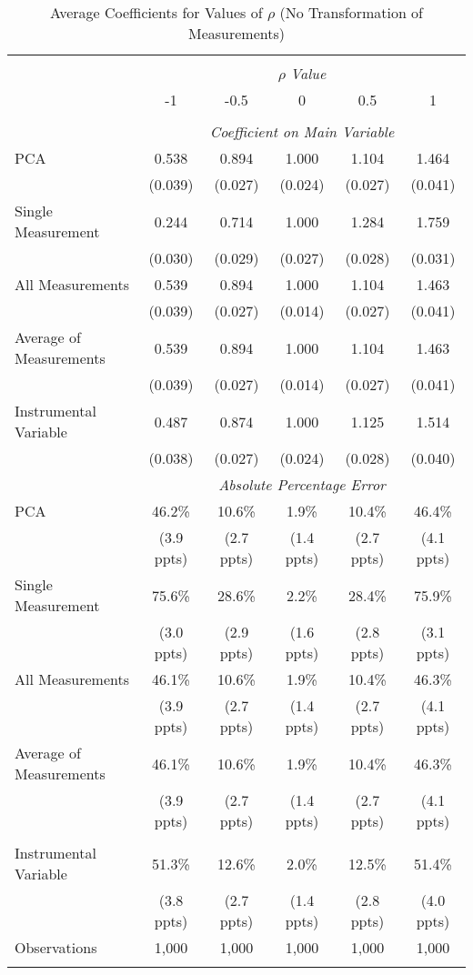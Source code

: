 \begin{table}[!htbp] \centering
  \caption{Average Coefficients for Values of $\rho$ (No Transformation of Measurements) \label{sim_rho_5_noexp}}
\begin{tabular}{@{\extracolsep{5pt}}lccccc}
\\[-1.8ex]\hline
\hline \\[-1.8ex]
& \multicolumn{5}{c}{$\rho$ \textit{ Value}} \
\cr \
\\[-1.8ex] & -1 & -0.5 & 0 & 0.5 & 1 \\
\hline \\[-1.8ex]
& \multicolumn{5}{c}{\textit{Coefficient on Main Variable}} \\
PCA & 0.538 & 0.894 & 1.000 & 1.104 & 1.464  \\
& (0.039) & (0.027) & (0.024) & (0.027) & (0.041)\\
Single Measurement & 0.244 & 0.714 & 1.000 & 1.284 & 1.759  \\
& (0.030) & (0.029) & (0.027) & (0.028) & (0.031)\\
All Measurements & 0.539 & 0.894 & 1.000 & 1.104 & 1.463  \\
  & (0.039) & (0.027) & (0.014) & (0.027) & (0.041)\\
 Average of Measurements & 0.539 & 0.894 & 1.000 & 1.104 & 1.463  \\
  & (0.039) & (0.027) & (0.014) & (0.027) & (0.041)\\
  Instrumental Variable & 0.487 & 0.874 & 1.000 & 1.125 & 1.514 \\
  & (0.038) & (0.027) & (0.024) & (0.028) & (0.040) \\

  & \multicolumn{5}{c}{\textit{Absolute Percentage Error}} \\
  PCA & 46.2\% & 10.6\% & 1.9\% & 10.4\% & 46.4\% \\
   & (3.9 ppts) & (2.7 ppts) & (1.4 ppts) & (2.7 ppts) & (4.1 ppts)\\
   Single Measurement & 75.6\% & 28.6\% & 2.2\% & 28.4\% & 75.9\%  \\
   & (3.0 ppts) & (2.9 ppts) & (1.6 ppts) & (2.8 ppts) & (3.1 ppts)\\
 All Measurements & 46.1\% & 10.6\% & 1.9\% & 10.4\% & 46.3\%  \\
  & (3.9 ppts) & (2.7 ppts) & (1.4 ppts) & (2.7 ppts) & (4.1 ppts)\\
  Average of Measurements & 46.1\% & 10.6\% & 1.9\% & 10.4\% & 46.3\% \\
  & (3.9 ppts) & (2.7 ppts) & (1.4 ppts) & (2.7 ppts) & (4.1 ppts)\\
  \hline \\[-1.8ex]
  Instrumental Variable & 51.3\% & 12.6\% & 2.0\% & 12.5\% & 51.4\% \\
  & (3.8 ppts) & (2.7 ppts) & (1.4 ppts) & (2.8 ppts) & (4.0 ppts) \\
  
 Observations & 1,000 & 1,000 & 1,000 & 1,000 & 1,000\\
\hline
\hline \\[-1.8ex]
\end{tabular}
\end{table}